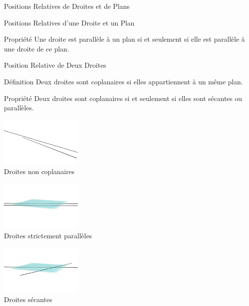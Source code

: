 \documentclass{cours}
\begin{document}
\begin{Gpartie}{Positions Relatives de Droites et de Plans}
\begin{Spartie}{Positions Relatives d'une Droite et un Plan}
\begin{center}
            \end{center}
            \begin{SSpartie}{Propriété} 
                Une droite est parallèle à un plan si et seulement si elle est parallèle à une droite de ce plan.
            \end{SSpartie}
        \end{Spartie}
        \begin{Spartie}{Position Relative de Deux Droites} 
            \begin{SSpartie}{Définition} 
                Deux droites sont coplanaires si elles appartiennent à un même plan.
            \end{SSpartie}
            \begin{SSpartie}{Propriété} 
                Deux droites sont coplanaires si et seulement si elles sont sécantes ou parallèles.
                \begin{center}
                    \begin{minipage}{4cm}\includegraphics[width=4cm]{rsc/11fig6a.png}\\ \centering Droites non coplanaires\end{minipage}
                    \begin{minipage}{4cm}\includegraphics[width=4cm]{rsc/11fig6b.png}\\ \centering Droites strictement parallèles\end{minipage} 
                    \begin{minipage}{4cm}\includegraphics[width=4cm]{rsc/11fig6c.png}\\ \centering Droites sécantes\end{minipage}

\end{center}
\end{SSpartie}
\end{Spartie}
\end{Gpartie}
\end{document}
